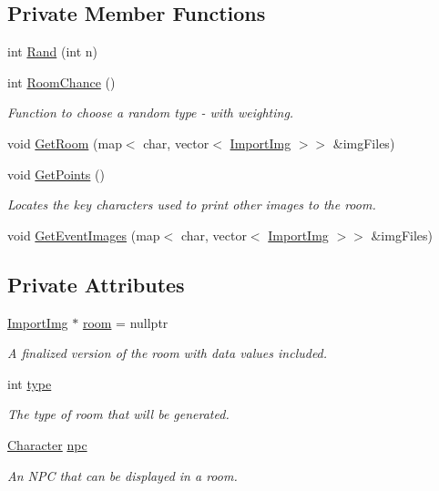 \subsection*{Private Member Functions}
\begin{DoxyCompactItemize}
\item 
int \hyperlink{classRoom_aebcb2b6bf73c7a2592a1e5c5d02b40ce}{Rand} (int n)
\item 
int \hyperlink{classRoom_aa44d19f37e62cbf130727c7aa3be0757}{Room\-Chance} ()
\begin{DoxyCompactList}\small\item\em Function to choose a random type -\/ with weighting. \end{DoxyCompactList}\item 
void \hyperlink{classRoom_ad791cbeff004df5ae7c8655f85e540ae}{Get\-Room} (map$<$ char, vector$<$ \hyperlink{classImportImg}{Import\-Img} $>$$>$ \&img\-Files)
\item 
void \hyperlink{classRoom_a15f3f815f6d41e61e7e12465994fa185}{Get\-Points} ()
\begin{DoxyCompactList}\small\item\em Locates the key characters used to print other images to the room. \end{DoxyCompactList}\item 
void \hyperlink{classRoom_a3e33111e62068e4ae0fef5b17a1f1841}{Get\-Event\-Images} (map$<$ char, vector$<$ \hyperlink{classImportImg}{Import\-Img} $>$$>$ \&img\-Files)
\end{DoxyCompactItemize}
\subsection*{Private Attributes}
\begin{DoxyCompactItemize}
\item 
\hyperlink{classImportImg}{Import\-Img} $\ast$ \hyperlink{classRoom_a4d493bf25d07a6880b399adedd3a10e6}{room} = nullptr
\begin{DoxyCompactList}\small\item\em A finalized version of the room with data values included. \end{DoxyCompactList}\item 
int \hyperlink{classRoom_a209eba22dbc85cb190906de3f0363e59}{type}
\begin{DoxyCompactList}\small\item\em The type of room that will be generated. \end{DoxyCompactList}\item 
\hyperlink{classCharacter}{Character} \hyperlink{classRoom_af71bf7f7e63180da0359dc28be358a46}{npc}
\begin{DoxyCompactList}\small\item\em An N\-P\-C that can be displayed in a room. \end{DoxyCompactList}\end{DoxyCompactItemize}


